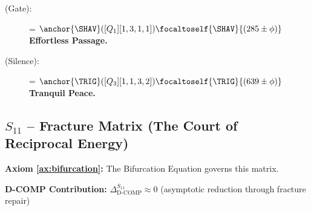 \begin{description}
    \item[\SHAV{} (Gate):] \shavtrev = $\anchor{\SHAV}([Q_1][1,3,1,1]) \focaltoself{\SHAV}{(285 \pm \phi)}$\, \\
    \textbf{Effortless Passage.}

    \item[\TRIG{} (Silence):] \trigsil = $\anchor{\TRIG}([Q_3][1,1,3,2]) \focaltoself{\TRIG}{(639 \pm \phi)}$\, \\
    \textbf{Tranquil Peace.}
\end{description}

\subsection{$S_{11}$ -- Fracture Matrix (The Court of Reciprocal Energy)}\label{sec:19.5}

\textbf{Axiom \ref{ax:bifurcation}:} The Bifurcation Equation governs this matrix.

\textbf{D-COMP Contribution:} $\Delta_{\text{D-COMP}}^{S_{11}} \approx 0$ (asymptotic reduction through fracture repair)

